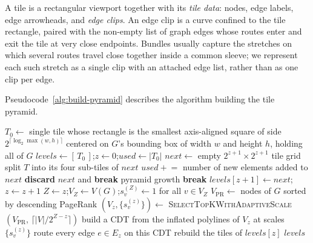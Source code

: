 \documentclass[a4paper,USenglish,anonymous]{gd-lipics-v3}
\begin{document}
A tile is a rectangular viewport together with its \emph{tile data}:
nodes, edge labels, edge arrowheads, and \emph{edge clips}. An edge
clip is a curve confined to the tile rectangle, paired with the
non-empty list of graph edges whose routes enter and exit the tile at
very close endpoints. Bundles usually capture the stretches on which
several routes travel close together inside a common sleeve; we
represent each such stretch as a single clip with an attached edge
list, rather than as one clip per edge.

Pseudocode~\ref{alg:build-pyramid} describes the algorithm building
the tile pyramid.
\begin{algorithm}[t]
\caption{\textsc{BuildTilePyramid}$(G, \mathit{TileCapacity}, \mathit{minTileSize}, \mathcal{M}_{\max})$}
\label{alg:build-pyramid}
\begin{algorithmic}[1]
\State $T_0 \gets$ single tile whose rectangle is the smallest axis-aligned square of side $2^{\lceil \log_2 \max(w,h)\rceil}$ centered on $G$'s bounding box of width $w$ and height $h$, holding all of $G$
\State $\mathit{levels} \gets [\,T_0\,]$;\quad $z \gets 0$;\quad $\mathit{used} \gets |T_0|$ 
  \State $\mathit{next} \gets$ empty $2^{z+1}{\times}2^{z+1}$ tile grid
   
    \State split $T$ into its four sub-tiles of $\mathit{next}$ \label{algln:split}
    \State $\mathit{used} \mathrel{+}=$ number of new elements added to $\mathit{next}$
     
      \State \textbf{discard} $\mathit{next}$ and \textbf{break} pyramid growth
    \EndIf
  \EndFor
    \State \textbf{break} 
  \EndIf
  \State $\mathit{levels}[z{+}1] \gets \mathit{next}$;\quad $z \gets z + 1$
\EndWhile
\State $Z \gets z$;\quad $V_Z \gets V(G)$;\quad $s_v^{(Z)} \gets 1$ for all $v\in V_Z$
\State $V_{\mathrm{PR}} \gets$ nodes of $G$ sorted by descending PageRank
  \State $(V_z, \{s_v^{(z)}\}) \gets$ \textsc{SelectTopKWithAdaptiveScale}$(V_{\mathrm{PR}},\, \lceil |V|/2^{Z-z}\rceil)$ 
  \State build a CDT from the inflated polylines of $V_z$ at scales $\{s_v^{(z)}\}$
  \State route every edge $e\in E_z$ on this CDT
  \State rebuild the tiles of $\mathit{levels}[z]$ \label{algln:rebuild}
\EndFor
\State \Return $\mathit{levels}$
\end{algorithmic}
\end{algorithm}
\end{document}
